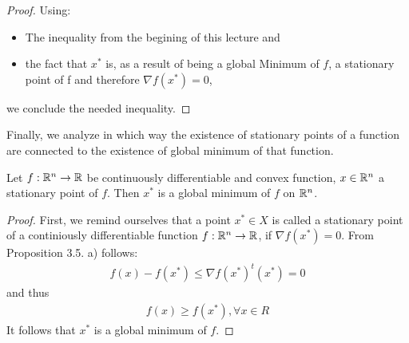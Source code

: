 \begin{proof}
	Using: 
	\begin{itemize}
		\item The inequality  from the begining of this lecture and 
		\item the fact that $x^*$ is, as a result of being a global Minimum of $f$, a stationary point of f and therefore $\nabla f(x^*)=0$,
	\end{itemize}
	we conclude the needed inequality.
\end{proof}

Finally, we analyze in which way the existence of stationary points of a function are connected to the existence of global minimum of that function.

\begin{satz}
	Let $f:\mathbb{R}^n\rightarrow\mathbb{R}$ be continuously differentiable and convex function, $x\in\mathbb{R}^n$ a stationary point of $f$. Then $x^*$ is a global minimum of $f$ on $\mathbb{R}^n$. 
\end{satz}

\begin{proof}
	First, we remind ourselves that a point $x^*\in X$ is called a stationary point of a continiously differentiable function $f:\mathbb{R}^n\rightarrow\mathbb{R}$, if $\nabla f(x^*)=0$.
	From Proposition 3.5. a) follows: 
	\begin{align*}
	f(x)-f(x^*)\leq\nabla f(x^*)^t (x^*)=0
	\end{align*}
	and thus 
	\begin{align*}
	f(x)\geq f(x^*), \forall x\in R
	\end{align*}
	It follows that $x^*$ is a global minimum of $f$.
\end{proof}